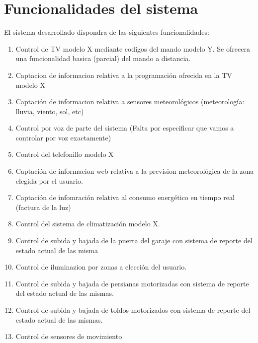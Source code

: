 \chapter{Funcionalidades del sistema}

El sistema desarrollado dispondra de las siguientes funcionalidades:
\begin{enumerate}

    \item Control de TV modelo X mediante codigos del mando modelo Y. Se ofrecera una funcionalidad basica (parcial) del mando a distancia.

    \item Captacion de informacion relativa a la programación ofrecida en la TV modelo X

    \item Captación de informacion relativa a sensores meteorológicos (meteorología: lluvia, viento, sol, etc)

    \item Control por voz de parte del sistema  (Falta por especificar que vamos a controlar por voz exactamente)

    \item Control del telefonillo modelo X

    \item Captación de informacion web relativa a la prevision meteorológica de la zona elegida por el usuario.

    \item Captación de infomración relativa al consumo energético en tiempo real (factura de la luz)

    \item Control del sistema de climatización modelo X.

    \item Control de subida y bajada de la puerta del garaje con sistema de reporte del estado actual de las misma

    \item Control de iluminazion por zonas a elección del usuario.

    \item Control de subida y bajada de persianas motorizadas con sistema de reporte del estado actual de las mismas.

    \item Control de subida y bajada de toldos motorizados con sistema de reporte del estado actual de las mismas.

    \item Control de sensores de movimiento


\end{enumerate}
